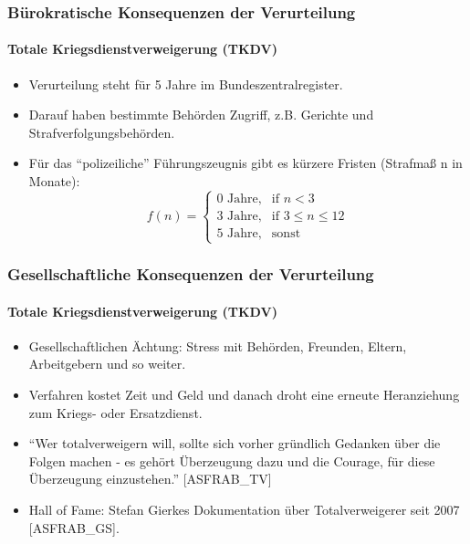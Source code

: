 \documentclass{beamer}
\begin{document}
	\begin{frame}
	  	\frametitle{Bürokratische Konsequenzen der Verurteilung}
	  	\framesubtitle{Totale Kriegsdienstverweigerung (TKDV)}
		\begin{itemize}
			\item Verurteilung steht für 5 Jahre im Bundeszentralregister. 
			\item Darauf haben bestimmte Behörden Zugriff, z.B. Gerichte und Strafverfolgungsbehörden.
			\item Für das \enquote{polizeiliche} Führungszeugnis gibt es kürzere Fristen (Strafmaß n in Monate):
					\[
					f(n)= 
					\begin{cases}
					\text{0 Jahre}, & \text{if } n < 3\\
					\text{3 Jahre}, & \text{if } 3 \leq n \leq 12\\
					\text{5 Jahre}, & \text{sonst}
					\end{cases}
					\]
		\end{itemize}
	\end{frame}
		
	\begin{frame}
		  	\frametitle{Gesellschaftliche Konsequenzen der Verurteilung}
		  	\framesubtitle{Totale Kriegsdienstverweigerung (TKDV)}
		  	\begin{itemize}
		  		\item Gesellschaftlichen Ächtung: Stress mit Behörden, Freunden, Eltern, Arbeitgebern und so weiter.
		  		\item Verfahren kostet Zeit und Geld und danach droht eine erneute Heranziehung zum Kriegs- oder Ersatzdienst.
		  		\item \enquote{Wer totalverweigern will, sollte sich vorher gründlich Gedanken über die Folgen machen - es gehört Überzeugung dazu und die Courage, für diese Überzeugung einzustehen.} [ASFRAB\_TV]
		  		\item Hall of Fame: Stefan Gierkes Dokumentation über Totalverweigerer seit 2007 [ASFRAB\_GS]. 
		  	\end{itemize}
	\end{frame}
	
\end{document}
